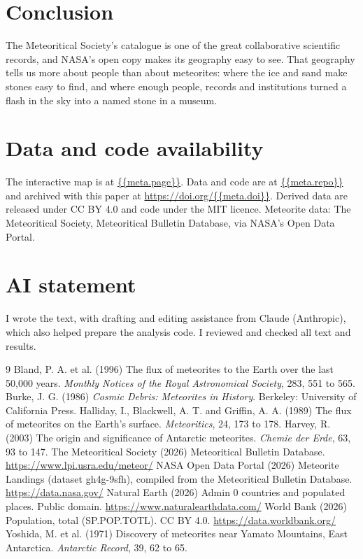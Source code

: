 \documentclass[11pt,a4paper]{article}
\begin{document}
\section{Conclusion}
The Meteoritical Society's catalogue is one of the great collaborative scientific records, and NASA's open copy makes its geography easy to see. That geography tells us more about people than about meteorites: where the ice and sand make stones easy to find, and where enough people, records and institutions turned a flash in the sky into a named stone in a museum.

\section*{Data and code availability}
The interactive map is at \url{{{meta.page}}}. Data and code are at \url{{{meta.repo}}} and archived with this paper at \url{https://doi.org/{{meta.doi}}}. Derived data are released under CC BY 4.0 and code under the MIT licence. Meteorite data: The Meteoritical Society, Meteoritical Bulletin Database, via NASA's Open Data Portal.

\section*{AI statement}
I wrote the text, with drafting and editing assistance from Claude (Anthropic), which also helped prepare the analysis code. I reviewed and checked all text and results.

\begin{thebibliography}{9}
 Bland, P. A. et al. (1996) The flux of meteorites to the Earth over the last 50,000 years. \emph{Monthly Notices of the Royal Astronomical Society}, 283, 551 to 565.
 Burke, J. G. (1986) \emph{Cosmic Debris: Meteorites in History}. Berkeley: University of California Press.
 Halliday, I., Blackwell, A. T. and Griffin, A. A. (1989) The flux of meteorites on the Earth's surface. \emph{Meteoritics}, 24, 173 to 178.
 Harvey, R. (2003) The origin and significance of Antarctic meteorites. \emph{Chemie der Erde}, 63, 93 to 147.
 The Meteoritical Society (2026) Meteoritical Bulletin Database. \url{https://www.lpi.usra.edu/meteor/}
 NASA Open Data Portal (2026) Meteorite Landings (dataset gh4g-9sfh), compiled from the Meteoritical Bulletin Database. \url{https://data.nasa.gov/}
 Natural Earth (2026) Admin 0 countries and populated places. Public domain. \url{https://www.naturalearthdata.com/}
 World Bank (2026) Population, total (SP.POP.TOTL). CC BY 4.0. \url{https://data.worldbank.org/}
 Yoshida, M. et al. (1971) Discovery of meteorites near Yamato Mountains, East Antarctica. \emph{Antarctic Record}, 39, 62 to 65.
\end{thebibliography}
\end{document}
